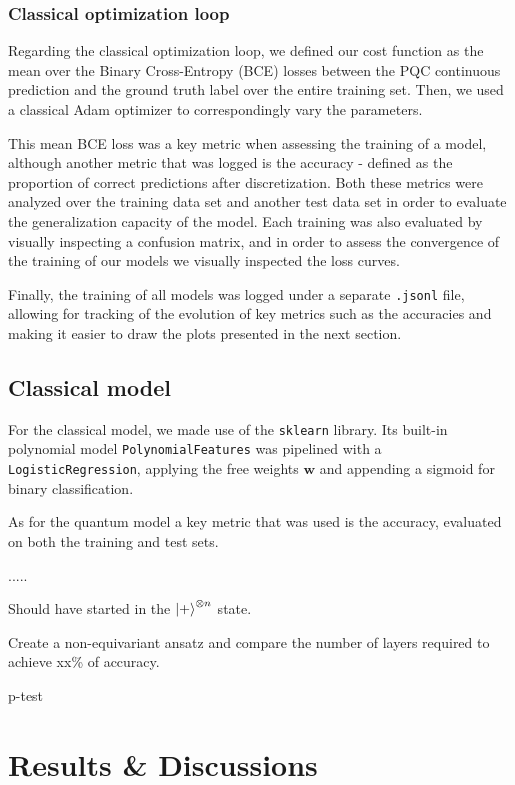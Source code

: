 \documentclass{article}
\theoremstyle{definition}
\theoremstyle{plain}
\begin{document}
\subsubsection*{Classical optimization loop}

Regarding the classical optimization loop, we defined our cost function as the mean over the Binary Cross-Entropy (BCE) losses between the PQC continuous prediction and the ground truth label over the entire training set. Then, we used a classical Adam optimizer to correspondingly vary the parameters.

This mean BCE loss was a key metric when assessing the training of a model, although another metric that was logged is the accuracy - defined as the proportion of correct predictions after discretization. Both these metrics were analyzed over the training data set and another test data set in order to evaluate the generalization capacity of the model. Each training was also evaluated by visually inspecting a confusion matrix, and in order to assess the convergence of the training of our models we visually inspected the loss curves.

Finally, the training of all models was logged under a separate \texttt{.jsonl} file, allowing for tracking of the evolution of key metrics such as the accuracies and making it easier to draw the plots presented in the next section.

\subsection{Classical model}

For the classical model, we made use of the \texttt{sklearn} library. Its built-in polynomial model \texttt{PolynomialFeatures} was pipelined with a \texttt{LogisticRegression}, applying the free weights $\mathbf{w}$ and appending a sigmoid for binary classification.

As for the quantum model a key metric that was used is the accuracy, evaluated on both the training and test sets.






.....


Should have started in the $\ket{+}^{\otimes n}$ state.

Create a non-equivariant ansatz and compare the number of layers required to achieve xx\% of accuracy.

p-test


\section{Results \& Discussions}
\end{document}
